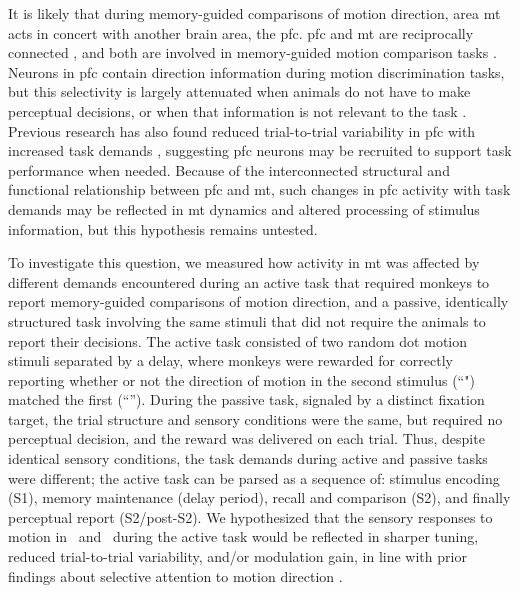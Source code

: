 It is likely that during memory-guided comparisons of motion direction, area \gls{mt} acts in concert with another brain area, the \gls{pfc}. \Gls{pfc} and \gls{mt} are reciprocally connected \parencite{Ungerleider1986, Barbas1988, Petrides2006}, and both are involved in memory-guided motion comparison tasks \parencite{Zaksas2006}. Neurons in \gls{pfc} contain direction information during motion discrimination tasks, but this selectivity is largely attenuated when animals do not have to make perceptual decisions, or when that information is not relevant to the task \parencite{Hussar2009, Hussar2012, Hussar2013}. Previous research has also found reduced trial-to-trial variability in \gls{pfc} with increased task demands \parencite{Hussar2010}, suggesting \gls{pfc} neurons may be recruited to support task performance when needed. Because of the interconnected structural and functional relationship between \gls{pfc} and \gls{mt}, such changes in \gls{pfc} activity with task demands may be reflected in \gls{mt} dynamics and altered processing of stimulus information, but this hypothesis remains untested.

To investigate this question, we measured how activity in \gls{mt} was affected by different demands encountered during an active task that required monkeys to report memory-guided comparisons of motion direction, and a passive, identically structured task involving the same stimuli that did not require the animals to report their decisions. 
The active task consisted of two random dot motion stimuli separated by a delay, where monkeys were rewarded for correctly reporting whether or not the direction of motion in the second stimulus (``\test") matched the first (``\sample''). 
During the passive task, signaled by a distinct fixation target, the trial structure and sensory conditions were the same, but required no perceptual decision, and the reward was delivered on each trial.
Thus, despite identical sensory conditions, the task demands during active and passive tasks were different; the active task can be parsed as a sequence of: stimulus encoding (S1), memory maintenance (delay period), recall and comparison (S2), and finally perceptual report (S2/post-S2). 
We hypothesized that the sensory responses to motion in \sample\ and \test\ during the active task would be reflected in sharper tuning, reduced trial-to-trial variability, and/or modulation gain, in line with prior findings about selective attention to motion direction \parencite{Ponce-Alvarez2013, Cohen2008, Arandia-Romero2016}. 


